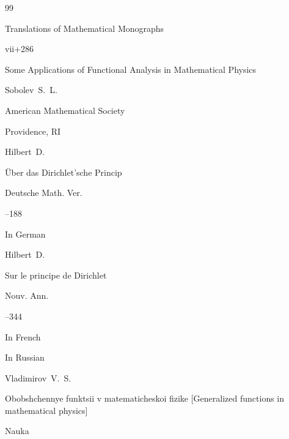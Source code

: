\begin{thebibliography}{99}

\serial Translations of Mathematical Monographs


\totalpages vii+286 


\book Some Applications of Functional Analysis in Mathematical Physics

\by Sobolev~S.~L.

\publ American Mathematical Society

\publaddr Providence, RI









\by Hilbert~D.

\paper \"Uber das Dirichlet’sche Princip

\jour Deutsche Math. Ver.




--188

\lang In German



\transl

\by Hilbert~D.

\paper Sur le principe de Dirichlet

\jour Nouv. Ann.




--344

\lang In French





\lang In Russian

\by Vladimirov~V.~S.

\book Obobshchennye funktsii v matematicheskoi fizike \rm  [Generalized functions in mathematical physics] 


\publ Nauka


\end{thebibliography}
